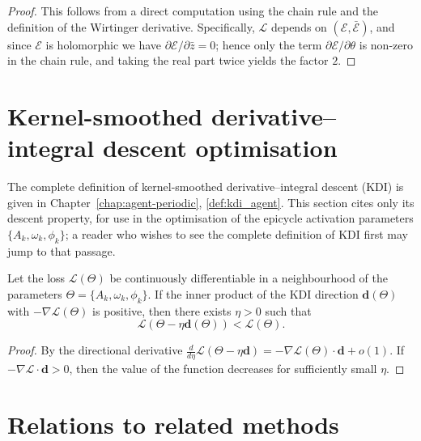 \begin{proof}
This follows from a direct computation using the chain rule and the definition of the Wirtinger derivative. Specifically, $\mathcal L$ depends on $(\mathcal E, \bar{\mathcal E})$, and since $\mathcal E$ is holomorphic we have $\partial\mathcal E/\partial\bar z=0$; hence only the term $\partial\mathcal E/\partial\theta$ is non-zero in the chain rule, and taking the real part twice yields the factor $2$.
\end{proof}

\section{Kernel-smoothed derivative--integral descent optimisation}

\begin{remark}\label{rem:kdi-interface}
The complete definition of kernel-smoothed derivative--integral descent (KDI) is given in Chapter~\ref{chap:agent-periodic}, \cref{def:kdi_agent}. This section cites only its descent property, for use in the optimisation of the epicycle activation parameters $\{A_k,\omega_k,\phi_k\}$; a reader who wishes to see the complete definition of KDI first may jump to that passage.
\end{remark}

\begin{proposition}\label{prop:kdi-epicycle-descent}
Let the loss $\mathcal L(\Theta)$ be continuously differentiable in a neighbourhood of the parameters $\Theta=\{A_k,\omega_k,\phi_k\}$. If the inner product of the KDI direction $\mathbf d(\Theta)$ with $-\nabla\mathcal L(\Theta)$ is positive, then there exists $\eta>0$ such that
\[
\mathcal L(\Theta-\eta\mathbf d(\Theta))<\mathcal L(\Theta).
\]
\end{proposition}

\begin{proof}
By the directional derivative $\frac{d}{d\eta}\mathcal L(\Theta-\eta\mathbf d)=-\nabla\mathcal L(\Theta)\cdot\mathbf d+o(1)$. If $-\nabla\mathcal L\cdot\mathbf d>0$, then the value of the function decreases for sufficiently small $\eta$.
\end{proof}

\section{Relations to related methods}

